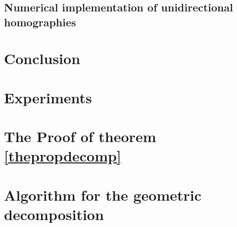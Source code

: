 \documentclass[a4paper,11pt]{article}
\theoremstyle{plain}
\theoremstyle{definition}
\begin{document}
		\subsection{Numerical implementation of unidirectional homographies}
			\label{HomoboxRipmap}
			\label{YaroSzeli}
	\clearpage
	\section*{Conclusion}
			
	\clearpage
	\section{Experiments}
		\label{experiences}
		
		\clearpage
		
		\clearpage
		
		\clearpage
		
		\clearpage
	\appendix
	\section{The Proof of theorem \ref{thepropdecomp}}
	        
	\label{pseudo_code}
	\section{Algorithm for the geometric decomposition}
		
	\nocite{*}
	
	
\end{document}
